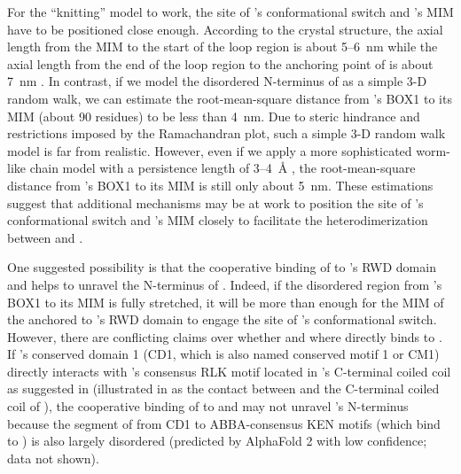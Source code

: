 For the ``knitting'' model to work, the site of 's conformational switch and 's MIM have to be positioned close enough. According to the crystal structure, the axial length from the MIM to the start of the loop region is about 5--\SI{6}{nm} while the axial length from the end of the loop region to the anchoring point of  is about \SI{7}{nm} \cite{TemplateModel, Ji2017eLife, BUB1-CDC20-MAD1, Structure1GO4, Structure4DZO}. In contrast, if we model the disordered N-terminus of  as a simple 3-D random walk, we can estimate the root-mean-square distance from 's BOX1 to its MIM (about 90 residues) to be less than \SI{4}{nm}. Due to steric hindrance and restrictions imposed by the Ramachandran plot, such a simple 3-D random walk model is far from realistic. However, even if we apply a more sophisticated worm-like chain model with a persistence length of 3--\SI{4}{\r{A}} \cite{RandomWalk3D-WormLikeChain}, the root-mean-square distance from 's BOX1 to its MIM is still only about \SI{5}{nm}. These estimations suggest that additional mechanisms may be at work to position the site of 's conformational switch and 's MIM closely to facilitate the heterodimerization between  and .

One suggested possibility \cite{BUB1-CDC20-MAD1, Tripartite} is that the cooperative binding of  to 's RWD domain and  helps to unravel the N-terminus of . Indeed, if the disordered region from 's BOX1 to its MIM is fully stretched, it will be more than enough for the MIM of the  anchored to 's RWD domain to engage the site of 's conformational switch. However, there are conflicting claims over whether and where  directly binds to  \cite{Ji2017eLife, BUB1-CDC20-MAD1, BUB1CD1-MAD1CStructure}. If 's conserved domain 1 (CD1, which is also named conserved motif 1 or CM1) directly interacts with 's consensus RLK motif located in 's C-terminal coiled coil as suggested in \cite{Ji2017eLife, BUB1CD1-MAD1CStructure} (illustrated in  as the contact between  and the C-terminal coiled coil of ), the cooperative binding of  to  and  may not unravel 's N-terminus because the segment of  from CD1 to ABBA-consensus KEN motifs (which bind to  \cite{BUB1-CDC20-MAD1, CDC20-KEN, ABBA}) is also largely disordered (predicted by AlphaFold 2 with low confidence; data not shown).


